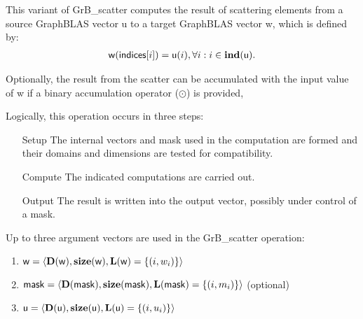 This variant of {\sf GrB\_scatter} computes the result of scattering elements from 
a source GraphBLAS vector {\sf u} to a target GraphBLAS vector {\sf w}, which is defined by: 
\[
\begin{aligned}
	{\sf w}({\sf indices}[i]) = {\sf u}(i), \forall i : i \in \bold{ind}({\sf u}).
\end{aligned}
\]  

Optionally, the result from the scatter can be accumulated with the input value of {\sf w}
if a binary accumulation 
operator ($\odot$) is provided, 

Logically, this operation occurs in three steps:
\begin{enumerate}[leftmargin=0.75in]
\item[Setup] The internal vectors and mask used in the computation are formed 
and their domains and dimensions are tested for compatibility.
\item[Compute] The indicated computations are carried out.
\item[Output] The result is written into the output vector, possibly under 
control of a mask.
\end{enumerate}

Up to three argument vectors are used in the {\sf GrB\_scatter} operation:
\begin{enumerate}
	\item ${\sf w} = \langle \bold{D}({\sf w}),\bold{size}({\sf w}),
    \bold{L}({\sf w}) = \{(i,w_i) \} \rangle$
    
	\item ${\sf mask} = \langle \bold{D}({\sf mask}),\bold{size}({\sf mask}),
    \bold{L}({\sf mask}) = \{(i,m_i) \} \rangle$ (optional)
    
	\item ${\sf u} = \langle \bold{D}({\sf u}),\bold{size}({\sf u}),
    \bold{L}({\sf u}) = \{(i,u_i) \} \rangle$
\end{enumerate}

